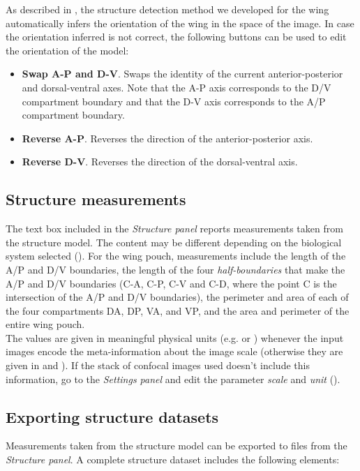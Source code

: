 As described in , the structure detection method we developed for the \droso wing automatically infers the orientation of the wing in the space of the image. In case the orientation inferred is not correct, the following buttons can be used to edit the orientation of the model:

\begin{itemize}
 \item \textbf{Swap A-P and D-V}. Swaps the identity of the current anterior-posterior and dorsal-ventral axes. Note that the A-P axis corresponds to the D/V compartment boundary and that the D-V axis corresponds to the A/P compartment boundary.
 \item \textbf{Reverse A-P}. Reverses the direction of the anterior-posterior axis.
 \item \textbf{Reverse D-V}. Reverses the direction of the dorsal-ventral axis. 
\end{itemize}

\subsection{Structure measurements}\label{sec:wingj_structure_measurements}
The text box included in the \textit{Structure panel} reports measurements taken from the structure model. The content may be different depending on the biological system selected (). For the wing pouch, measurements include the length of the A/P and D/V boundaries, the length of the four \textit{half-boundaries} that make the A/P and D/V boundaries (C-A, C-P, C-V and C-D, where the point C is the intersection of the A/P and D/V boundaries), the perimeter and area of each of the four compartments DA, DP, VA, and VP, and the area and perimeter of the entire wing pouch.\\

The values are given in meaningful physical units (e.g. \mum or \mumsquare) whenever the input images encode the meta-information about the image scale (otherwise they are given in \px and \pxsquare). If the stack of confocal images used doesn't include this information, go to the \textit{Settings panel} and edit the parameter \textit{scale} and \textit{unit} ().

\subsection{Exporting structure datasets}\label{sec:wingj_structure_dataset}
Measurements taken from the structure model can be exported to files from the \emph{Structure panel}. A complete structure dataset includes the following elements:

